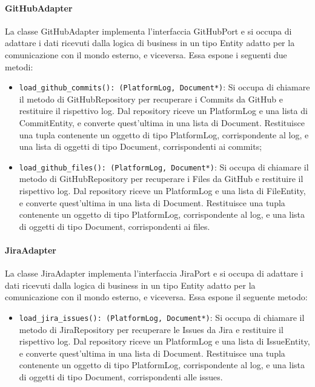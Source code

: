 \paragraph{GitHubAdapter}
\label{sec:github_adapter}
La classe GitHubAdapter implementa l'interfaccia GitHubPort e si occupa di adattare i dati ricevuti dalla logica di business in un tipo Entity adatto per la comunicazione con il mondo esterno, e viceversa. Essa espone i seguenti due metodi:
\begin{itemize}
    \item \texttt{load\_github\_commits(): (PlatformLog, Document*)}: Si occupa di chiamare il metodo di GitHubRepository per recuperare i Commits da GitHub e restituire il rispettivo log. Dal repository riceve un PlatformLog e una lista di CommitEntity, e converte quest'ultima in una lista di Document. Restituisce una tupla contenente un oggetto di tipo PlatformLog, corrispondente al log, e una lista di oggetti di tipo Document, corrispondenti ai commits;
    \item \texttt{load\_github\_files(): (PlatformLog, Document*)}: Si occupa di chiamare il metodo di GitHubRepository per recuperare i Files da GitHub e restituire il rispettivo log. Dal repository riceve un PlatformLog e una lista di FileEntity, e converte quest'ultima in una lista di Document. Restituisce una tupla contenente un oggetto di tipo PlatformLog, corrispondente al log, e una lista di oggetti di tipo Document, corrispondenti ai files.
\end{itemize}

\paragraph{JiraAdapter}
\label{sec:jira_adapter}
La classe JiraAdapter implementa l'interfaccia JiraPort e si occupa di adattare i dati ricevuti dalla logica di business in un tipo Entity adatto per la comunicazione con il mondo esterno, e viceversa. Essa espone il seguente metodo:
\begin{itemize}
    \item \texttt{load\_jira\_issues(): (PlatformLog, Document*)}: Si occupa di chiamare il metodo di JiraRepository per recuperare le Issues da Jira e restituire il rispettivo log. Dal repository riceve un PlatformLog e una lista di IssueEntity, e converte quest'ultima in una lista di Document. Restituisce una tupla contenente un oggetto di tipo PlatformLog, corrispondente al log, e una lista di oggetti di tipo Document, corrispondenti alle issues.
\end{itemize}

